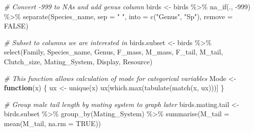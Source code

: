 \documentclass[
  12pt,
]{article}
\newenvironment{Shaded}{\begin{snugshade}}{\end{snugshade}}
\newcommand{\AttributeTok}[1]{\textcolor[rgb]{0.77,0.63,0.00}{#1}}
\newcommand{\CommentTok}[1]{\textcolor[rgb]{0.56,0.35,0.01}{\textit{#1}}}
\newcommand{\ConstantTok}[1]{\textcolor[rgb]{0.00,0.00,0.00}{#1}}
\newcommand{\ControlFlowTok}[1]{\textcolor[rgb]{0.13,0.29,0.53}{\textbf{#1}}}
\newcommand{\DecValTok}[1]{\textcolor[rgb]{0.00,0.00,0.81}{#1}}
\newcommand{\FunctionTok}[1]{\textcolor[rgb]{0.00,0.00,0.00}{#1}}
\newcommand{\NormalTok}[1]{#1}
\newcommand{\OtherTok}[1]{\textcolor[rgb]{0.56,0.35,0.01}{#1}}
\newcommand{\SpecialCharTok}[1]{\textcolor[rgb]{0.00,0.00,0.00}{#1}}
\newcommand{\StringTok}[1]{\textcolor[rgb]{0.31,0.60,0.02}{#1}}
\begin{document}
\begin{Shaded}
\begin{Highlighting}[]
\CommentTok{\# Convert {-}999 to NAs and add genus column}
\NormalTok{birds }\OtherTok{\textless{}{-}}\NormalTok{ birds }\SpecialCharTok{\%\textgreater{}\%}
  \FunctionTok{na\_if}\NormalTok{(., }\SpecialCharTok{{-}}\DecValTok{999}\NormalTok{) }\SpecialCharTok{\%\textgreater{}\%}
  \FunctionTok{separate}\NormalTok{(Species\_name, }
           \AttributeTok{sep =} \StringTok{" "}\NormalTok{, }
           \AttributeTok{into =} \FunctionTok{c}\NormalTok{(}\StringTok{"Genus"}\NormalTok{, }\StringTok{"Sp"}\NormalTok{), }
           \AttributeTok{remove =} \ConstantTok{FALSE}\NormalTok{)}

\CommentTok{\# Subset to columns we are interested in}
\NormalTok{birds.subset }\OtherTok{\textless{}{-}}\NormalTok{ birds }\SpecialCharTok{\%\textgreater{}\%}
  \FunctionTok{select}\NormalTok{(Family, Species\_name, Genus, F\_mass, M\_mass, }
\NormalTok{         F\_tail, M\_tail, Clutch\_size, Mating\_System, }
\NormalTok{         Display, Resource)}

\CommentTok{\# This function allows calculation of mode for categorical variables}
\NormalTok{Mode }\OtherTok{\textless{}{-}} \ControlFlowTok{function}\NormalTok{(x) \{}
\NormalTok{  ux }\OtherTok{\textless{}{-}} \FunctionTok{unique}\NormalTok{(x) }
\NormalTok{  ux[}\FunctionTok{which.max}\NormalTok{(}\FunctionTok{tabulate}\NormalTok{(}\FunctionTok{match}\NormalTok{(x, ux)))]}
\NormalTok{\}}

\CommentTok{\# Group male tail length by mating system to graph later}
\NormalTok{birds.mating.tail }\OtherTok{\textless{}{-}}\NormalTok{ birds.subset }\SpecialCharTok{\%\textgreater{}\%}
  \FunctionTok{group\_by}\NormalTok{(Mating\_System) }\SpecialCharTok{\%\textgreater{}\%}
  \FunctionTok{summarise}\NormalTok{(}\AttributeTok{M\_tail =} \FunctionTok{mean}\NormalTok{(M\_tail, }\AttributeTok{na.rm =} \ConstantTok{TRUE}\NormalTok{))}


\end{Highlighting}
\end{Shaded}
\end{document}
